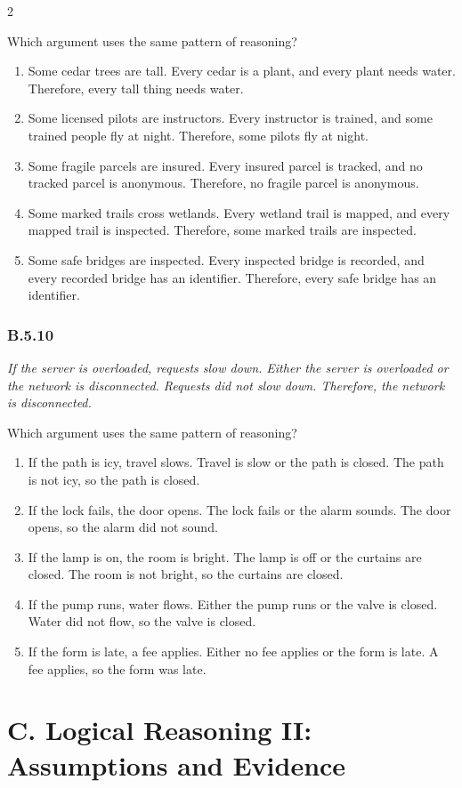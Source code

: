 \documentclass[10pt]{extarticle}
\newcommand{\choice}[1]{\item #1}
\newcommand{\bankitem}[1]{\subsubsection*{#1}}
\begin{document}
\begin{multicols}{2}
\begin{samepage}
Which argument uses the same pattern of reasoning?
\begin{enumerate}[label=(\alph*)]
  \choice{Some cedar trees are tall. Every cedar is a plant, and every plant needs water. Therefore, every tall thing needs water.}
  \choice{Some licensed pilots are instructors. Every instructor is trained, and some trained people fly at night. Therefore, some pilots fly at night.}
  \choice{Some fragile parcels are insured. Every insured parcel is tracked, and no tracked parcel is anonymous. Therefore, no fragile parcel is anonymous.}
  \choice{Some marked trails cross wetlands. Every wetland trail is mapped, and every mapped trail is inspected. Therefore, some marked trails are inspected.}
  \choice{Some safe bridges are inspected. Every inspected bridge is recorded, and every recorded bridge has an identifier. Therefore, every safe bridge has an identifier.}
\end{enumerate}
\end{samepage}\par\smallskip
\begin{samepage}
\bankitem{B.5.10}
\emph{If the server is overloaded, requests slow down. Either the server is overloaded or the network is disconnected. Requests did not slow down. Therefore, the network is disconnected.}

Which argument uses the same pattern of reasoning?
\begin{enumerate}[label=(\alph*)]
  \choice{If the path is icy, travel slows. Travel is slow or the path is closed. The path is not icy, so the path is closed.}
  \choice{If the lock fails, the door opens. The lock fails or the alarm sounds. The door opens, so the alarm did not sound.}
  \choice{If the lamp is on, the room is bright. The lamp is off or the curtains are closed. The room is not bright, so the curtains are closed.}
  \choice{If the pump runs, water flows. Either the pump runs or the valve is closed. Water did not flow, so the valve is closed.}
  \choice{If the form is late, a fee applies. Either no fee applies or the form is late. A fee applies, so the form was late.}
\end{enumerate}
\end{samepage}\par\smallskip
\section*{C. Logical Reasoning II: Assumptions and Evidence}

\end{multicols}
\end{document}
